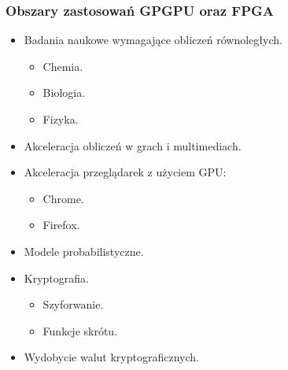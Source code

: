 \documentclass[dvipsnames,table]{beamer}
\begin{document}

\begin{frame}
	\frametitle{Obszary zastosowań GPGPU oraz FPGA} 
\begin{itemize}
	\item Badania naukowe wymagające obliczeń równoległych.
	\begin{itemize}
		\item Chemia.
		\item Biologia.
		\item Fizyka.
	\end{itemize}
	\item Akceleracja obliczeń w grach i multimediach.
	\item Akceleracja przeglądarek z użyciem GPU:
	\begin{itemize}
		\item Chrome.
		\item Firefox.
	\end{itemize}
	\item Modele probabilistyczne.
	\item Kryptografia.
	\begin{itemize}
		\item Szyforwanie.
		\item Funkcje skrótu.
	\end{itemize}
	\item Wydobycie walut kryptograficznych.
\end{itemize}
\end{frame}
\end{document}

